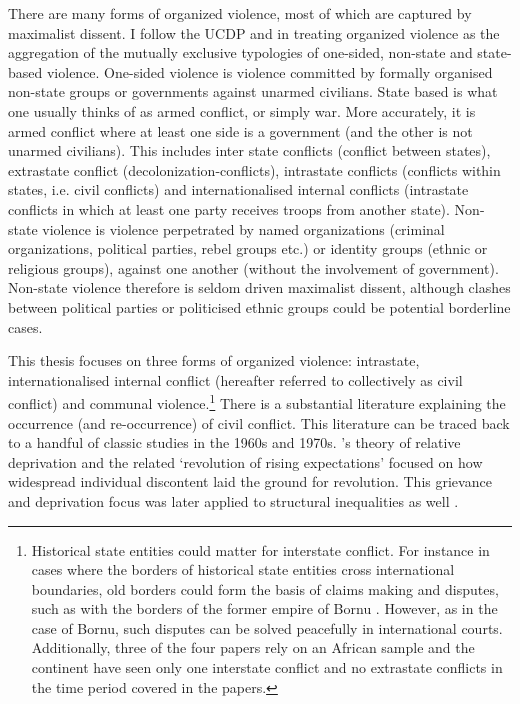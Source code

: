 \documentclass[12pt]{article}
\begin{document}
There are many forms of organized violence, most of which are captured by
maximalist dissent. I follow the UCDP and \citet{Melander_2016} in treating
organized violence as the aggregation of the mutually exclusive typologies of
one-sided, non-state and state-based violence. One-sided violence is violence
committed by formally organised non-state groups or governments against unarmed
civilians. State based is what one usually thinks of as armed conflict, or
simply war. More accurately, it is armed conflict where at least one side is a
government (and the other is not unarmed civilians). This includes inter state
conflicts (conflict between states), extrastate conflict
(decolonization-conflicts), intrastate conflicts (conflicts within states, i.e.
civil conflicts) and internationalised internal conflicts (intrastate conflicts
in which at least one party receives troops from another state). Non-state
violence is violence perpetrated by named organizations (criminal organizations,
political parties, rebel groups etc.) or identity groups (ethnic or religious
groups), against one another (without the involvement of government). Non-state
violence therefore is seldom driven maximalist dissent, although clashes between
political parties or politicised ethnic groups could be potential borderline
cases.

This thesis focuses on three forms of organized violence: intrastate,
internationalised internal conflict (hereafter referred to collectively as civil
conflict) and communal violence.\footnote{Historical state entities could matter
	for interstate conflict. For instance in cases where the borders of
	historical state entities cross international boundaries, old borders
	could form the basis of claims making and disputes, such as with the
	borders of the former empire of Bornu \citep{Hariri2012}. However, as in
	the case of Bornu, such disputes can be solved peacefully in
	international courts. Additionally, three of the four papers rely on an
	African sample and the continent have seen only one interstate conflict
and no extrastate conflicts in the time period covered in the papers.} There is
a substantial literature explaining the occurrence (and re-occurrence) of civil
conflict. This literature can be traced back to a handful of classic studies in
the 1960s and 1970s. \citet{GurrTedRobert1970Wmr}'s theory of relative
deprivation and the related `revolution of rising expectations'
\citep{Davies_1962} focused on how widespread individual discontent laid the
ground for revolution. This grievance and deprivation focus was later applied to
structural inequalities as well \citep{Muller_1985, Muller_1987,
ScottJamesC1977TMEo}. 
\end{document}
